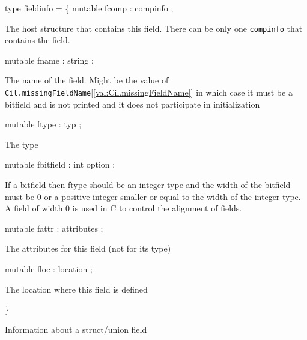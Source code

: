 \documentclass[11pt]{article}
\begin{document}
\label{type:Cil.fieldinfo}\begin{ocamldoccode}
type fieldinfo = \{
  mutable fcomp : compinfo ;
\end{ocamldoccode}
\begin{ocamldoccomment}
The host structure that contains this field. There can be only one 
 {\tt{compinfo}} that contains the field.
\end{ocamldoccomment}
\begin{ocamldoccode}
  mutable fname : string ;
\end{ocamldoccode}
\begin{ocamldoccomment}
The name of the field. Might be the value of {\tt{Cil.missingFieldName}}[\ref{val:Cil.missingFieldName}] 
 in which case it must be a bitfield and is not printed and it does not 
 participate in initialization
\end{ocamldoccomment}
\begin{ocamldoccode}
  mutable ftype : typ ;
\end{ocamldoccode}
\begin{ocamldoccomment}
The type
\end{ocamldoccomment}
\begin{ocamldoccode}
  mutable fbitfield : int option ;
\end{ocamldoccode}
\begin{ocamldoccomment}
If a bitfield then ftype should be an integer type and the width of 
 the bitfield must be 0 or a positive integer smaller or equal to the 
 width of the integer type. A field of width 0 is used in C to control 
 the alignment of fields.
\end{ocamldoccomment}
\begin{ocamldoccode}
  mutable fattr : attributes ;
\end{ocamldoccode}
\begin{ocamldoccomment}
The attributes for this field (not for its type)
\end{ocamldoccomment}
\begin{ocamldoccode}
  mutable floc : location ;
\end{ocamldoccode}
\begin{ocamldoccomment}
The location where this field is defined
\end{ocamldoccomment}
\begin{ocamldoccode}
\}
\end{ocamldoccode}
\begin{ocamldocdescription}
Information about a struct/union field


\end{ocamldocdescription}
\end{document}
